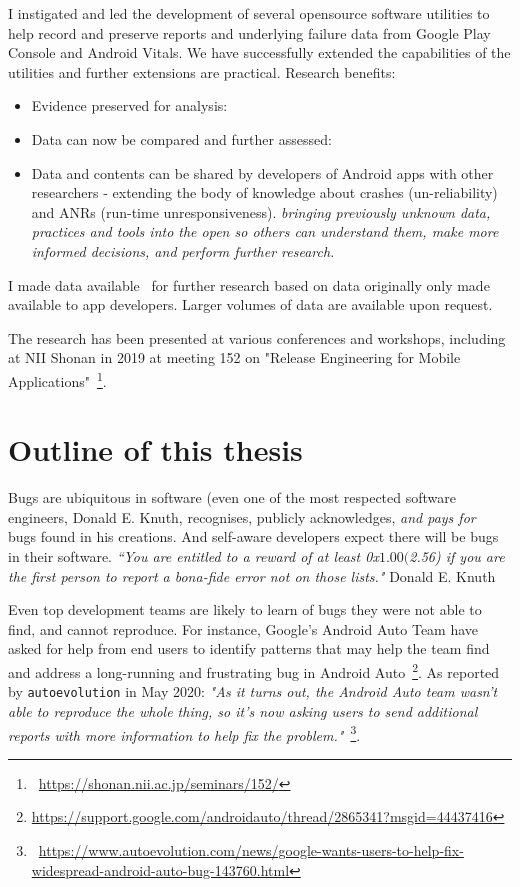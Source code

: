 I instigated and led the development of several opensource software utilities to help record and preserve reports and underlying failure data from Google Play Console and Android Vitals. We have successfully extended the capabilities of the utilities and further extensions are practical. Research benefits:
\begin{itemize}
    \item Evidence preserved for analysis:
    \item Data can now be compared and further assessed:
    \item Data and contents can be shared by developers of Android apps with other researchers - extending the body of knowledge about crashes (un-reliability) and ANRs (run-time unresponsiveness). \emph{bringing previously unknown data, practices and tools into the open so others can understand them, make more informed decisions, and perform further research.}
\end{itemize}

I made data available~\cite{harty_wama_dataset_examples} for further research based on data originally only made available to app developers. Larger volumes of data are available upon request.

The research has been presented at various conferences and workshops, including at NII Shonan in 2019 at meeting 152 on "Release Engineering for Mobile Applications"~\footnote{~\url{https://shonan.nii.ac.jp/seminars/152/}}. 

\section{Outline of this thesis}
Bugs are ubiquitous in software (even one of the most respected software engineers, Donald E. Knuth, recognises, publicly acknowledges, \emph{and pays for}~\cite{knuth_trutex, wikipedia__knuth_reward_checks_2020} bugs found in his creations. And self-aware developers expect there will be bugs in their software. \emph{``You are entitled to a reward of at least 0x$1.00 ($2.56) if you are the first person to report a bona-fide error not on those lists."} Donald E. Knuth~\cite{knuth_the_bank_of_san_serriffe}

Even top development teams are likely to learn of bugs they were not able to find, and cannot reproduce. For instance, Google's Android Auto Team have asked for help from end users to identify patterns that may help the team find and address a long-running and frustrating bug in Android Auto~\footnote{\url{https://support.google.com/androidauto/thread/2865341?msgid=44437416}}. As reported by \texttt{autoevolution} in May 2020:  
\emph{"As it turns out, the Android Auto team wasn’t able to reproduce the whole thing, so it’s now asking users to send additional reports with more information to help fix the problem."}~\footnote{~\url{https://www.autoevolution.com/news/google-wants-users-to-help-fix-widespread-android-auto-bug-143760.html}}.


